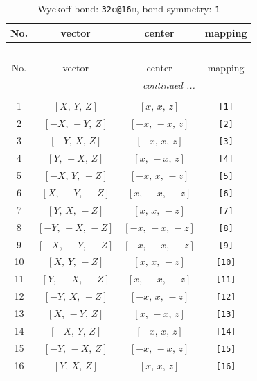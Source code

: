 \documentclass[fleqn,8pt]{jsarticle}
\begin{document}
\begin{longtable}{cccc}
\caption{Wyckoff bond: {\tt 32c@16m}, bond symmetry: {\tt 1}}
 \\
 \hline \hline
No. & vector & center & mapping \\ \hline \endfirsthead

\multicolumn{3}{l}{\tablename\ \thetable{}} \\
 \hline \hline
No. & vector & center & mapping \\ \hline \endhead

 \hline \hline
\multicolumn{3}{r}{\footnotesize\it continued ...} \\ \endfoot

 \hline \hline
\multicolumn{3}{r}{} \\ \endlastfoot

1 & $\left[ X,\, Y,\, Z \right]$ & $\left[ x,\, x,\, z \right]$ & {\tt [1]} \\ \hline
2 & $\left[ - X,\, - Y,\, Z \right]$ & $\left[ - x,\, - x,\, z \right]$ & {\tt [2]} \\ \hline
3 & $\left[ - Y,\, X,\, Z \right]$ & $\left[ - x,\, x,\, z \right]$ & {\tt [3]} \\ \hline
4 & $\left[ Y,\, - X,\, Z \right]$ & $\left[ x,\, - x,\, z \right]$ & {\tt [4]} \\ \hline
5 & $\left[ - X,\, Y,\, - Z \right]$ & $\left[ - x,\, x,\, - z \right]$ & {\tt [5]} \\ \hline
6 & $\left[ X,\, - Y,\, - Z \right]$ & $\left[ x,\, - x,\, - z \right]$ & {\tt [6]} \\ \hline
7 & $\left[ Y,\, X,\, - Z \right]$ & $\left[ x,\, x,\, - z \right]$ & {\tt [7]} \\ \hline
8 & $\left[ - Y,\, - X,\, - Z \right]$ & $\left[ - x,\, - x,\, - z \right]$ & {\tt [8]} \\ \hline
9 & $\left[ - X,\, - Y,\, - Z \right]$ & $\left[ - x,\, - x,\, - z \right]$ & {\tt [9]} \\ \hline
10 & $\left[ X,\, Y,\, - Z \right]$ & $\left[ x,\, x,\, - z \right]$ & {\tt [10]} \\ \hline
11 & $\left[ Y,\, - X,\, - Z \right]$ & $\left[ x,\, - x,\, - z \right]$ & {\tt [11]} \\ \hline
12 & $\left[ - Y,\, X,\, - Z \right]$ & $\left[ - x,\, x,\, - z \right]$ & {\tt [12]} \\ \hline
13 & $\left[ X,\, - Y,\, Z \right]$ & $\left[ x,\, - x,\, z \right]$ & {\tt [13]} \\ \hline
14 & $\left[ - X,\, Y,\, Z \right]$ & $\left[ - x,\, x,\, z \right]$ & {\tt [14]} \\ \hline
15 & $\left[ - Y,\, - X,\, Z \right]$ & $\left[ - x,\, - x,\, z \right]$ & {\tt [15]} \\ \hline
16 & $\left[ Y,\, X,\, Z \right]$ & $\left[ x,\, x,\, z \right]$ & {\tt [16]} \\
\end{longtable}
\end{document}
